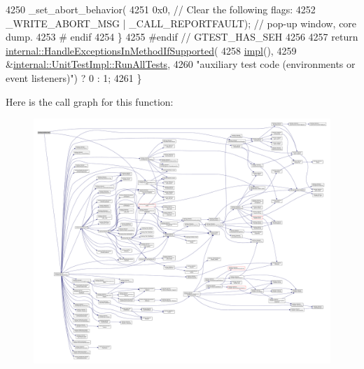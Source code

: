 \begin{DoxyCode}
4250       \_set\_abort\_behavior(
4251           0x0,                                    \textcolor{comment}{// Clear the following flags:}
4252           \_WRITE\_ABORT\_MSG | \_CALL\_REPORTFAULT);  \textcolor{comment}{// pop-up window, core dump.}
4253 \textcolor{preprocessor}{# endif}
4254   \}
4255 \textcolor{preprocessor}{#endif  // GTEST\_HAS\_SEH}
4256 
4257   \textcolor{keywordflow}{return} \hyperlink{namespacetesting_1_1internal_addb2ed165b92b74e25fe9ebe9e46b9f9}{internal::HandleExceptionsInMethodIfSupported}(
4258       \hyperlink{classtesting_1_1UnitTest_a4df5d11a58affb337d7fa62eaa07690e}{impl}(),
4259       &\hyperlink{classtesting_1_1internal_1_1UnitTestImpl_a1fb6be9971f4768c4136a05aa9e7e375}{internal::UnitTestImpl::RunAllTests},
4260       \textcolor{stringliteral}{"auxiliary test code (environments or event listeners)"}) ? 0 : 1;
4261 \}
\end{DoxyCode}
Here is the call graph for this function\+:
\nopagebreak
\begin{figure}[H]
\begin{center}
\leavevmode
\includegraphics[width=350pt]{classtesting_1_1UnitTest_a2febc800536b44500565f4c423f359d3_cgraph}
\end{center}
\end{figure}
\mbox{\label{classtesting_1_1UnitTest_a3d83fe1cc5570a1c34f9754b0f56d65f}} 
